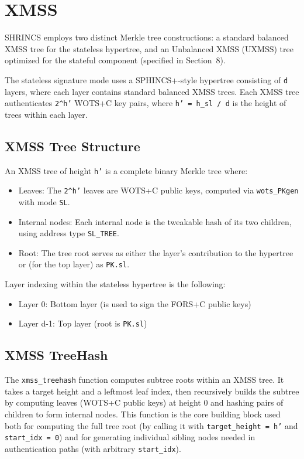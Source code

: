 \section{XMSS}
SHRINCS employs two distinct Merkle tree constructions: a standard balanced XMSS tree for the stateless hypertree, and an Unbalanced XMSS (UXMSS) tree optimized for the stateful component (specified in Section~8).

The stateless signature mode uses a SPHINCS+-style hypertree consisting of \texttt{d} layers, where each layer contains standard balanced XMSS trees. Each XMSS tree authenticates \texttt{2\string^h'} WOTS+C key pairs, where \texttt{h' = h\_sl / d} is the height of trees within each layer.

\subsection{XMSS Tree Structure}
An XMSS tree of height \texttt{h'} is a complete binary Merkle tree where:
\begin{itemize}
    \item Leaves: The \texttt{2\string^h'} leaves are WOTS+C public keys, computed via \texttt{wots\_PKgen} with mode \texttt{SL}.
    \item Internal nodes: Each internal node is the tweakable hash of its two children, using address type \texttt{SL\_TREE}.
    \item Root: The tree root serves as either the layer's contribution to the hypertree or (for the top layer) as \texttt{PK.sl}.
\end{itemize}

Layer indexing within the stateless hypertree is the following:
\begin{itemize}
    \item Layer 0: Bottom layer (is used to sign the FORS+C public keys)
    \item Layer d-1: Top layer (root is \texttt{PK.sl})
\end{itemize}

\subsection{XMSS TreeHash}
The \texttt{xmss\_treehash} function computes subtree roots within an XMSS tree. It takes a target height and a leftmost leaf index, then recursively builds the subtree by computing leaves (WOTS+C public keys) at height 0 and hashing pairs of children to form internal nodes. This function is the core building block used both for computing the full tree root (by calling it with \texttt{target\_height = h'} and \texttt{start\_idx = 0}) and for generating individual sibling nodes needed in authentication paths (with arbitrary \texttt{start\_idx}).

